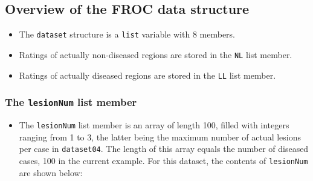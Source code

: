 \documentclass[]{book}
\newenvironment{Shaded}{\begin{snugshade}}{\end{snugshade}}
\newcommand{\CommentTok}[1]{\textcolor[rgb]{0.56,0.35,0.01}{\textit{#1}}}
\newcommand{\DecValTok}[1]{\textcolor[rgb]{0.00,0.00,0.81}{#1}}
\newcommand{\NormalTok}[1]{#1}
\newcommand{\OperatorTok}[1]{\textcolor[rgb]{0.81,0.36,0.00}{\textbf{#1}}}
\providecommand{\tightlist}{%
  \setlength{\itemsep}{0pt}\setlength{\parskip}{0pt}}
\begin{document}
\hypertarget{overview-of-the-froc-data-structure}{%
\subsection{Overview of the FROC data structure}\label{overview-of-the-froc-data-structure}}

\begin{itemize}
\tightlist
\item
  The \texttt{dataset} structure is a \texttt{list} variable with 8 members.
\item
  Ratings of actually non-diseased regions are stored in the \texttt{NL} list member.
\item
  Ratings of actually diseased regions are stored in the \texttt{LL} list member.
\end{itemize}

\hypertarget{the-lesionnum-list-member}{%
\subsubsection{\texorpdfstring{The \texttt{lesionNum} list member}{The lesionNum list member}}\label{the-lesionnum-list-member}}

\begin{itemize}
\tightlist
\item
  The \texttt{lesionNum} list member is an array of length 100, filled with integers ranging from 1 to 3, the latter being the maximum number of actual lesions per case in \texttt{dataset04}. The length of this array equals the number of diseased cases, 100 in the current example. For this dataset, the contents of \texttt{lesionNum} are shown below:
\end{itemize}

\begin{Shaded}
\end{Shaded}
\end{document}
